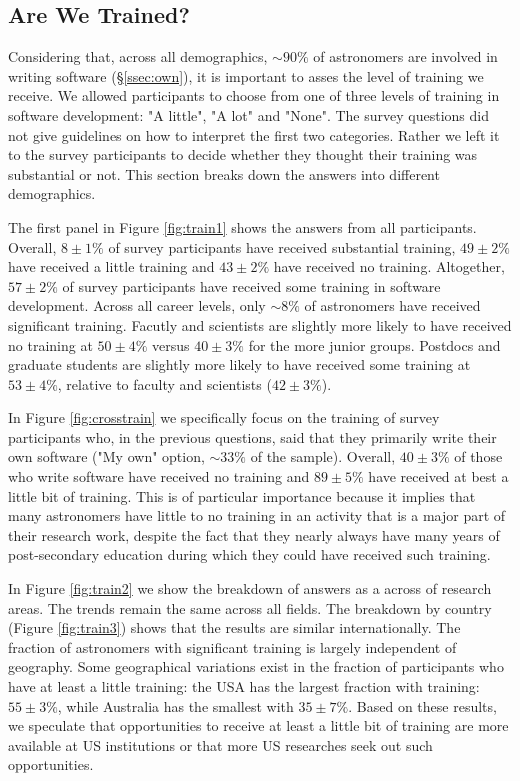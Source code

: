 \subsection{Are We Trained?}

Considering that, across all demographics, $\sim90\%$ of astronomers are involved in writing software (\S \ref{ssec:own}), it is important to asses the level of training we receive. We allowed participants to choose from one of three levels of training in software development: "A little", "A lot" and "None". The survey questions did not give guidelines on how to interpret the first two categories. Rather we left it to the survey participants to decide whether they thought their training was substantial or not. This section breaks down the answers into different demographics. 

The first panel in Figure \ref{fig:train1} shows the answers from all participants. Overall, $8\pm1\%$ of survey participants have received substantial training, $49\pm2\%$ have received a little training and $43\pm2\%$ have received no training. Altogether, $57\pm2\%$ of survey participants have received some training in software development. Across all career levels, only $\sim8\%$ of astronomers have received significant training. Facutly and scientists are slightly more likely to have received no training at $50\pm4\%$ versus $40\pm3\%$ for the more junior groups. Postdocs and graduate students are slightly more likely to have received some training at $53\pm4\%$, relative to faculty and scientists ($42\pm3\%$).

In Figure \ref{fig:crosstrain} we specifically focus on the training of survey participants who, in the previous questions, said that they primarily write their own software ("My own" option, $\sim33\%$ of the sample).  Overall, $40\pm3\%$ of those who write software have received no training and $89\pm5\%$ have received at best a little bit of training. This is of particular importance because it implies that many astronomers have little to no training in an activity that is a major part of their research work, despite the fact that they nearly always have many years of post-secondary education during which they could have received such training.

In Figure \ref{fig:train2} we show the breakdown of answers as a across of research areas. The trends remain the same across all fields.
The breakdown by country (Figure \ref{fig:train3}) shows that the results are similar internationally. The fraction of astronomers with significant training is largely independent of geography. Some geographical variations exist in the fraction of participants who have at least a little training: the USA has the largest fraction with training: $55\pm3\%$, while Australia has the smallest with $35\pm7\%$. Based on these results, we speculate that opportunities to receive at least a little bit of training are more available at US institutions or that more US researches seek out such opportunities. 

